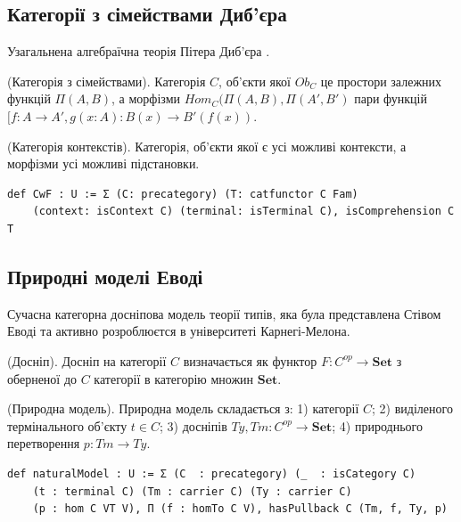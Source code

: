 \subsection{Категорії з сімействами Диб'єра}
Узагальнена алгебраїчна теорія Пітера Диб'єра \cite{Dybjer95}\cite{Dybjer08}\cite{Abel08}.

\begin{definition} (Категорія з сімействами). Категорія $C$, об'єкти якої $Ob_C$ це простори залежних функцій $\Pi(A,B)$,
а морфізми $Hom_C(\Pi(A,B),\Pi(A',B')$ пари функцій $[f:A \rightarrow A',g(x:A) : B(x) \rightarrow B'(f(x))$.
\end{definition}

\begin{definition} (Категорія контекстів). Категорія, об'єкти якої є усі можливі контексти,
а морфізми усі можливі підстановки.
\end{definition}

\begin{lstlisting}
def CwF : U := Σ (C: precategory) (T: catfunctor C Fam)
    (context: isContext C) (terminal: isTerminal C), isComprehension C T
\end{lstlisting}


\newpage
\subsection{Природні моделі Еводі}
Сучасна категорна досніпова модель теорії типів, яка була представлена Стівом Еводі та активно
розроблюєтся в університеті Карнегі-Мелона.

\begin{definition} (Досніп). Досніп на категорії $C$ визначається як
функтор $F: C^{op} \rightarrow \mathbf{Set}$ з оберненої до $C$ категорії
в категорію множин $\mathbf{Set}$.
\end{definition}

\begin{definition} (Природна модель). Природна модель складається з:
1) категорії $C$;
2) виділеного термінального об'єкту $t \in C$;
3) досніпів $Ty, Tm : C^{op} \rightarrow \mathbf{Set}$;
4) природнього перетворення $p : Tm \rightarrow Ty$.
\end{definition}

\begin{lstlisting}
def naturalModel : U := Σ (C  : precategory) (_  : isCategory C)
    (t : terminal C) (Tm : carrier C) (Ty : carrier C)
    (p : hom C VT V), Π (f : homTo C V), hasPullback C (Tm, f, Ty, p)
\end{lstlisting}

